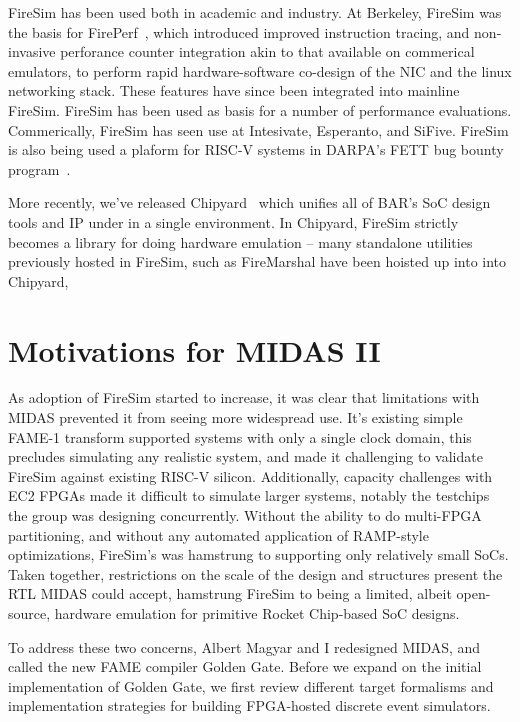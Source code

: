 FireSim has been used both in academic and industry. At Berkeley, FireSim was
the basis for FirePerf~\cite{FirePerf}, which introduced improved instruction
tracing, and non-invasive perforance counter integration akin to that available
on commerical emulators, to perform rapid hardware-software co-design of the
NIC and the linux networking stack. These features have since been integrated
into mainline FireSim. FireSim has been used as basis for a number of
performance evaluations.  Commerically, FireSim has seen use at Intesivate,
Esperanto, and SiFive. FireSim is also being used a plaform for RISC-V systems in DARPA's
FETT bug bounty program~\cite{FETT}.

More recently, we've released Chipyard~\cite{Chipyard} which unifies all of
BAR's SoC design tools and IP under in a single environment. In Chipyard,
FireSim strictly becomes a library for doing hardware emulation -- many
standalone utilities previously hosted in FireSim, such as FireMarshal have
been hoisted up into into Chipyard,

\section{Motivations for MIDAS II}

As adoption of FireSim started to increase, it was clear that limitations with
MIDAS prevented it from seeing more widespread use. It's existing simple FAME-1
transform supported systems with only a single clock domain, this precludes
simulating any realistic system, and made it challenging to validate FireSim
against existing RISC-V silicon. Additionally, capacity challenges with EC2
FPGAs made it difficult to simulate larger systems, notably the testchips the
group was designing concurrently. Without the ability to do multi-FPGA
partitioning, and without any automated application of RAMP-style
optimizations, FireSim's was hamstrung to supporting only relatively small
SoCs. Taken together, restrictions on the scale of the design and structures present
the RTL MIDAS could accept, hamstrung FireSim to being a limited, albeit
open-source, hardware emulation for primitive Rocket Chip-based SoC designs.

To address these two concerns, Albert Magyar and I redesigned MIDAS, and called
the new FAME compiler Golden Gate. Before we expand on the initial
implementation of Golden Gate, we first review different target formalisms and
implementation strategies for building FPGA-hosted discrete event simulators.

